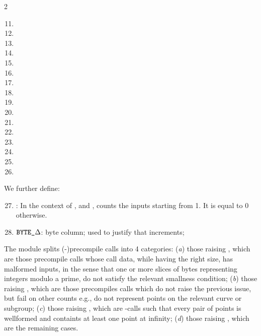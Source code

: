 \begin{multicols}{2}
    \begin{enumerate}
        \setcounter{enumi}{10}
        \item \isPointEvaluationData{}
        \item \isBlsGOneAddData{}
        \item \isBlsGOneMsmData{}
        \item \isBlsGTwoAddData{}
        \item \isBlsGTwoMsmData{}
        \item \isBlsPairingCheckData{}
        \item \isBlsMapFpToGOneData{}
        \item \isBlsMapFpTwoToGTwoData{}
        \item \isPointEvaluationResult{}
        \item \isBlsGOneAddResult{}
        \item \isBlsGOneMsmResult{}
        \item \isBlsGTwoAddResult{}
        \item \isBlsGTwoMsmResult{}
        \item \isBlsPairingCheckResult{}
        \item \isBlsMapFpToGOneResult{}
        \item \isBlsMapFpTwoToGTwoResult{}
    \end{enumerate}
\end{multicols}
\noindent We further define:
\begin{enumerate}[resume]
        \setcounter{enumi}{26}
    \item
        \accInputs:
        In the context of \instBlsGOneMsm{}, \instBlsGTwoMsm{} and \instBlsPairingCheck{}, counts the inputs starting from 1. It is equal to 0 otherwise.
    \item
        $\texttt{BYTE}\texttt{\_$\Delta$}$:
        byte column; used to justify that \blsId{} increments;
\end{enumerate}
The \blsDataMod{} module splits (-)precompile calls into 4 categories:
(\emph{a}) those raising \malformedDataInternalTot{}, which are those precompile calls whose call data, while having the right size, has malformed inputs, in the sense that one or more slices of bytes representing integers modulo a prime, do not satisfy the relevant smallness condition;
(\emph{b}) those raising \malformedDataExternalTot{}, which are those precompiles calls which do not raise the previous issue, but fail on other counts e.g., do not represent points on the relevant curve or subgroup;
(\emph{c}) those raising \wellformedDataTrivial{}, which are \instBlsPairingCheck-calls such that every pair of points is wellformed and containts at least one point at infinity;
(\emph{d}) those raising \wellformedDataNontrivial{}, which are the remaining cases.

